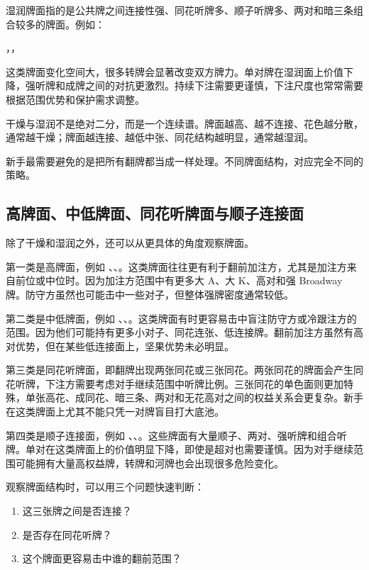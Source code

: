 湿润牌面指的是公共牌之间连接性强、同花听牌多、顺子听牌多、两对和暗三条组合较多的牌面。例如：

\begin{center}
，，
\end{center}

这类牌面变化空间大，很多转牌会显著改变双方牌力。单对牌在湿润面上价值下降，强听牌和成牌之间的对抗更激烈。持续下注需要更谨慎，下注尺度也常常需要根据范围优势和保护需求调整。

干燥与湿润不是绝对二分，而是一个连续谱。牌面越高、越不连接、花色越分散，通常越干燥；牌面越连接、越低中张、同花结构越明显，通常越湿润。

新手最需要避免的是把所有翻牌都当成一样处理。不同牌面结构，对应完全不同的策略。

\subsection{高牌面、中低牌面、同花听牌面与顺子连接面}

除了干燥和湿润之外，还可以从更具体的角度观察牌面。

第一类是高牌面，例如 、、。这类牌面往往更有利于翻前加注方，尤其是加注方来自前位或中位时。因为加注方范围中有更多大 A、大 K、高对和强 Broadway 牌。防守方虽然也可能击中一些对子，但整体强牌密度通常较低。

第二类是中低牌面，例如 、、。这类牌面有时更容易击中盲注防守方或冷跟注方的范围。因为他们可能持有更多小对子、同花连张、低连接牌。翻前加注方虽然有高对优势，但在某些低连接面上，坚果优势未必明显。

第三类是同花听牌面，即翻牌出现两张同花或三张同花。两张同花的牌面会产生同花听牌，下注方需要考虑对手继续范围中听牌比例。三张同花的单色面则更加特殊，单张高花、成同花、暗三条、两对和无花高对之间的权益关系会更复杂。新手在这类牌面上尤其不能只凭一对牌盲目打大底池。

第四类是顺子连接面，例如 、、。这些牌面有大量顺子、两对、强听牌和组合听牌。单对在这类牌面上的价值明显下降，即使是超对也需要谨慎。因为对手继续范围可能拥有大量高权益牌，转牌和河牌也会出现很多危险变化。

观察牌面结构时，可以用三个问题快速判断：

\begin{enumerate}
\item 这三张牌之间是否连接？
\item 是否存在同花听牌？
\item 这个牌面更容易击中谁的翻前范围？
\end{enumerate}

